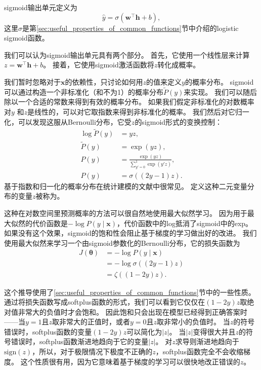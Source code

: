 sigmoid输出单元定义为
\begin{equation}
\hat{y} = \sigma \left (\bm{w}^\top \bm{h} + b \right ),
\end{equation}
这里$\sigma$是第\ref{sec:useful_properties_of_common_functions}节中介绍的logistic sigmoid函数。

我们可以认为sigmoid输出单元具有两个部分。
首先，它使用一个线性层来计算$z=\bm{w}^\top \bm{h}+b$。
接着，它使用sigmoid激活函数将$z$转化成概率。

我们暂时忽略对于$\bm{x}$的依赖性，只讨论如何用$z$的值来定义$y$的概率分布。
sigmoid可以通过构造一个非标准化（和不为1）的概率分布$\tilde{P}(y)$来实现。
我们可以随后除以一个合适的常数来得到有效的概率分布。
如果我们假定非标准化的对数概率对$y$ 和$z$是线性的，可以对它取指数来得到非标准化的概率。
我们然后对它归一化，可以发现这服从Bernoulli分布，它受$z$的sigmoid形式的变换控制：
\begin{align}
\log \tilde{P}(y) &= yz,\\
\tilde{P}(y) &= \exp(yz),\\
P(y) &= \frac{\exp(yz)}{\sum_{y' = 0}^1 \exp(y' z)},\\
P(y) &= \sigma((2y-1)z).
\end{align}
基于指数和归一化的概率分布在统计建模的文献中很常见。
定义这种二元变量分布的变量$z$被称为。


这种在对数空间里预测概率的方法可以很自然地使用最大似然学习。
因为用于最大似然的代价函数是$-\log P(y\mid\bm{x})$，代价函数中的log抵消了sigmoid中的exp。
如果没有这个效果，sigmoid的饱和性会阻止基于梯度的学习做出好的改进。
我们使用最大似然来学习一个由sigmoid参数化的Bernoulli分布，它的损失函数为
\begin{align}
J(\bm{\theta}) &= -\log P(y\mid\bm{x})\\
&= -\log \sigma ((2y-1)z)\\
&= \zeta((1-2y)z).
\end{align}

这个推导使用了\ref{sec:useful_properties_of_common_functions}节中的一些性质。
通过将损失函数写成softplus函数的形式，我们可以看到它仅仅在$(1-2y)z$取绝对值非常大的负值时才会饱和。
因此饱和只会出现在模型已经得到正确答案时——当$y=1$且$z$取非常大的正值时，或者$y=0$且$z$取非常小的负值时。
当$z$的符号错误时，softplus函数的变量$(1-2y)z$可以简化为$|z|$。
当$|z|$变得很大并且$z$的符号错误时，softplus函数渐进地趋向于它的变量$|z|$。
对$z$求导则渐进地趋向于$\text{sign}(z)$，所以，对于极限情况下极度不正确的$z$，softplus函数完全不会收缩梯度。
这个性质很有用，因为它意味着基于梯度的学习可以很快地改正错误的$z$。


